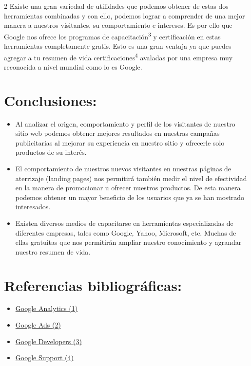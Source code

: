 \documentclass[12pt,spanish,Letterpaper,openany]{book}
\begin{document}
\begin {multicols}{2}
Existe una gran variedad de utilidades que podemos obtener de estas dos herramientas combinadas y con ello, podemos lograr a comprender de una mejor manera a nuestros visitantes, su comportamiento e intereses. Es por ello que Google nos ofrece los programas de capacitación\textsuperscript{3} y certificación en estas herramientas completamente gratis. Esto es una gran ventaja ya que puedes agregar a tu resumen de vida certificaciones\textsuperscript{4} avaladas por una empresa muy reconocida a nivel mundial como lo es Google.

\hypertarget{conclusiones-4}{%
\section{Conclusiones:}\label{conclusiones-4}}

\begin{itemize}
\item
  Al analizar el origen, comportamiento y perfil de los visitantes de nuestro sitio web podemos obtener mejores resultados en nuestras campañas publicitarias al mejorar su experiencia en nuestro sitio y ofrecerle solo productos de su interés.
\item
  El comportamiento de nuestros nuevos visitantes en nuestras páginas de aterrizaje (landing pages) nos permitirá también medir el nivel de efectividad en la manera de promocionar u ofrecer nuestros productos. De esta manera podemos obtener un mayor beneficio de los usuarios que ya se han mostrado interesados.
\item
  Existen diversos medios de capacitarse en herramientas especializadas de diferentes empresas, tales como Google, Yahoo, Microsoft, etc. Muchas de ellas gratuitas que nos permitirán ampliar nuestro conocimiento y agrandar nuestro resumen de vida.
\end{itemize}

\hypertarget{referencias-bibliograficas-4}{%
\section{Referencias bibliográficas:}\label{referencias-bibliograficas-4}}

\begin{itemize}
\item
  \href{https://analytics.google.com/analytics/web/}{Google Analytics (1)}
\item
  \href{https://ads.google.com}{Google Ads (2)}
\item
  \href{https://developers.google.com/training/}{Google Developers (3)}
\item
  \href{https://support.google.com/google-ads/answer/9028754?hl=es-419}{Google Support (4)}
\end{itemize}

\end {multicols}
\end{document}
